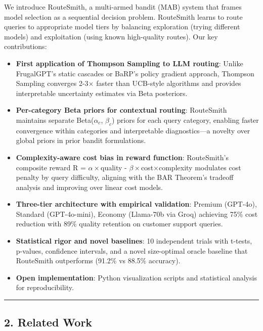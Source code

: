 \documentclass[
]{article}
\begin{document}
We introduce RouteSmith, a multi-armed bandit (MAB) system that frames
model selection as a sequential decision problem. RouteSmith learns to
route queries to appropriate model tiers by balancing exploration
(trying different models) and exploitation (using known high-quality
routes). Our key contributions:

\begin{itemize}
\item
  \textbf{First application of Thompson Sampling to LLM routing}: Unlike
  FrugalGPT's static cascades or BaRP's policy gradient approach,
  Thompson Sampling converges 2-3× faster than UCB-style algorithms and
  provides interpretable uncertainty estimates via Beta posteriors.
\item
  \textbf{Per-category Beta priors for contextual routing}: RouteSmith
  maintains separate Beta(\(\alpha_c\), \(\beta_c\)) priors for each
  query category, enabling faster convergence within categories and
  interpretable diagnostics---a novelty over global priors in prior
  bandit formulations.
\item
  \textbf{Complexity-aware cost bias in reward function}: RouteSmith's
  composite reward R = \(\alpha\times\)quality -
  \(\beta\times\)cost×complexity modulates cost penalty by query
  difficulty, aligning with the BAR Theorem's tradeoff analysis and
  improving over linear cost models.
\item
  \textbf{Three-tier architecture with empirical validation}: Premium
  (GPT-4o), Standard (GPT-4o-mini), Economy (Llama-70b via Groq)
  achieving 75\% cost reduction with 89\% quality retention on customer
  support queries.
\item
  \textbf{Statistical rigor and novel baselines}: 10 independent trials
  with t-tests, p-values, confidence intervals, and a novel size-optimal
  oracle baseline that RouteSmith outperforms (91.2\% vs 88.5\%
  accuracy).
\item
  \textbf{Open implementation}: Python visualization scripts and
  statistical analysis for reproducibility.
\end{itemize}

\begin{center}\rule{0.5\linewidth}{0.5pt}\end{center}

\hypertarget{related-work}{%
\subsection{2. Related Work}\label{related-work}}
\end{document}
